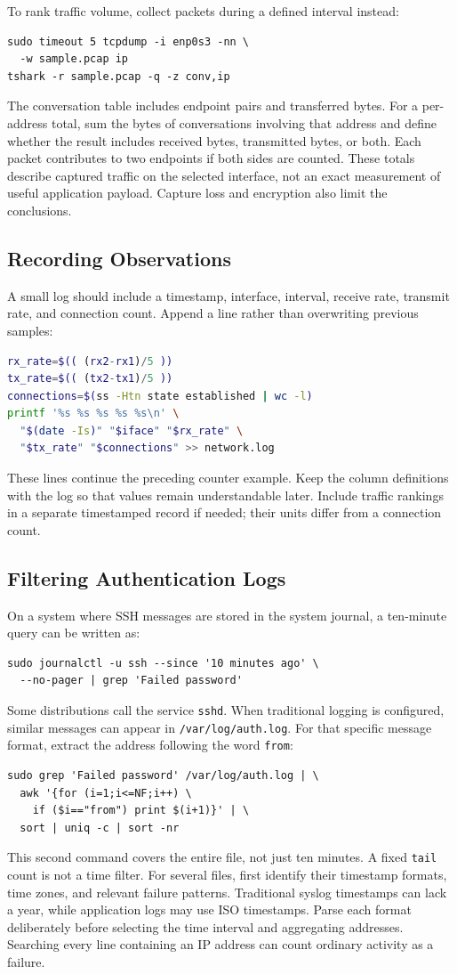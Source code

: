 \documentclass[journal]{IEEEtran}
\begin{document}
To rank traffic volume, collect packets during a defined interval instead:
\begin{lstlisting}
sudo timeout 5 tcpdump -i enp0s3 -nn \
  -w sample.pcap ip
tshark -r sample.pcap -q -z conv,ip
\end{lstlisting}
The conversation table includes endpoint pairs and transferred bytes. For a per-address total, sum the bytes of conversations involving that address and define whether the result includes received bytes, transmitted bytes, or both. Each packet contributes to two endpoints if both sides are counted. These totals describe captured traffic on the selected interface, not an exact measurement of useful application payload. Capture loss and encryption also limit the conclusions.

\subsection{Recording Observations}
A small log should include a timestamp, interface, interval, receive rate, transmit rate, and connection count. Append a line rather than overwriting previous samples:
\begin{lstlisting}[language=bash]
rx_rate=$(( (rx2-rx1)/5 ))
tx_rate=$(( (tx2-tx1)/5 ))
connections=$(ss -Htn state established | wc -l)
printf '%s %s %s %s %s\n' \
  "$(date -Is)" "$iface" "$rx_rate" \
  "$tx_rate" "$connections" >> network.log
\end{lstlisting}
These lines continue the preceding counter example. Keep the column definitions with the log so that values remain understandable later. Include traffic rankings in a separate timestamped record if needed; their units differ from a connection count.

\subsection{Filtering Authentication Logs}
On a system where SSH messages are stored in the system journal, a ten-minute query can be written as:
\begin{lstlisting}
sudo journalctl -u ssh --since '10 minutes ago' \
  --no-pager | grep 'Failed password'
\end{lstlisting}
Some distributions call the service \texttt{sshd}. When traditional logging is configured, similar messages can appear in \texttt{/var/log/auth.log}. For that specific message format, extract the address following the word \texttt{from}:
\begin{lstlisting}
sudo grep 'Failed password' /var/log/auth.log | \
  awk '{for (i=1;i<=NF;i++) \
    if ($i=="from") print $(i+1)}' | \
  sort | uniq -c | sort -nr
\end{lstlisting}
This second command covers the entire file, not just ten minutes. A fixed \texttt{tail} count is not a time filter. For several files, first identify their timestamp formats, time zones, and relevant failure patterns. Traditional syslog timestamps can lack a year, while application logs may use ISO timestamps. Parse each format deliberately before selecting the time interval and aggregating addresses. Searching every line containing an IP address can count ordinary activity as a failure.
\end{document}
